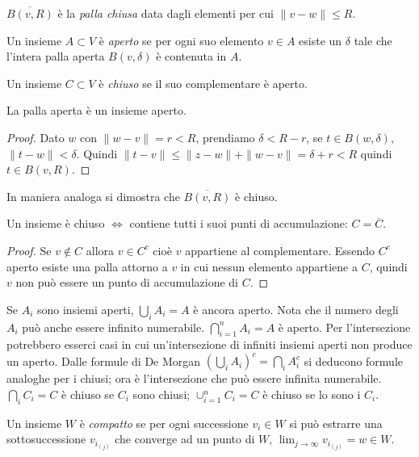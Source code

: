 \begin{definition}
$\overline{B(v,R)}$ è la \emph{palla chiusa} data dagli elementi
per cui $\|v-w\| \leq R$.
\end{definition}

\begin{definition}[aperto]
Un insieme $A \subset V$ è \emph{aperto} se per ogni suo elemento $v\in A$
esiste un $\delta$ tale che l'intera palla aperta $B(v, \delta)$ è contenuta
in $A$.
\end{definition}

\begin{definition}[chiuso]
Un insieme $C \subset V$ è \emph{chiuso} se il suo complementare è aperto.
\end{definition}

\begin{theorem}
La palla aperta è un insieme aperto.
\end{theorem}
\begin{proof}
Dato $w$ con $\|w-v\|=r<R$, prendiamo
$\delta < R-r$, se $t \in B(w, \delta)$, $\|t-w\| < \delta$. Quindi $\|t-v\|
\leq \|z-w\| + \|w-v\| = \delta +r < R$ quindi $t \in B(v,R)$. 
\end{proof}
In maniera analoga si dimostra che $\overline{B(v,R)}$ è chiuso.
\begin{theorem}
Un insieme è chiuso $\iff$ contiene tutti i suoi punti di accumulazione:
$C = \overline{C}$.
\end{theorem}
\begin{proof}
Se $v \notin C$ allora $v \in C^c$ cioè $v$ appartiene al
complementare. Essendo $C^c$ aperto esiste una palla attorno a $v$ in cui
nessun elemento appartiene a $C$, quindi $v$ non può essere un punto di
accumulazione di $C$.
\end{proof}
Se $A_i$ sono insiemi aperti, $\bigcup_i A_i = A$ è ancora aperto. Nota che
il numero degli $A_i$ può anche essere infinito numerabile. 
$\bigcap_{i = 1}^n A_i = A$ è aperto. Per l'intersezione potrebbero esserci
casi in cui un'intersezione di infiniti insiemi aperti non produce un aperto.
Dalle formule di De Morgan $(\bigcup_i A_i)^c = \bigcap_i A_i^c$ si deducono
formule analoghe per i chiusi; ora è l'intersezione che può essere infinita
numerabile. $\bigcap_i C_i = C$ è chiuso se $C_i$ sono chiusi; 
$\cup_{i=1}^n C_i = C$ è chiuso se lo sono i $C_i$.

\begin{definition}[compatto]
Un insieme $W$ è \emph{compatto} se per ogni successione $v_i\in W$ si può
estrarre una sottosuccessione $v_{i_{(j)}}$ che converge ad un punto di $W$,
$\lim_{j \to \infty} v_{i_{(j)}} = w \in W$.
\end{definition}

